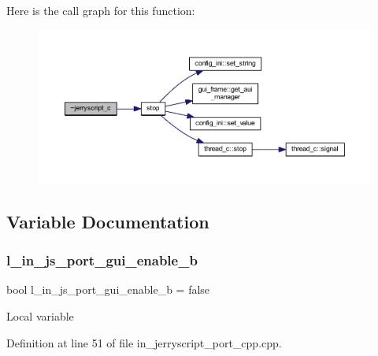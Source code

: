 Here is the call graph for this function\+:\nopagebreak
\begin{figure}[H]
\begin{center}
\leavevmode
\includegraphics[width=350pt]{group___port_gada28d8430f0b476ab1f392245b2b5fc4_cgraph}
\end{center}
\end{figure}


\subsection{Variable Documentation}
\mbox{\label{group___port_gad52187b22dd0de50cb3dfe7dae1a4e4d}} 
\subsubsection{l\_in\_js\_port\_gui\_enable\_b}
{\footnotesize\ttfamily bool l\+\_\+in\+\_\+js\+\_\+port\+\_\+gui\+\_\+enable\+\_\+b = false}

Local variable 

Definition at line 51 of file in\+\_\+jerryscript\+\_\+port\+\_\+cpp.\+cpp.

